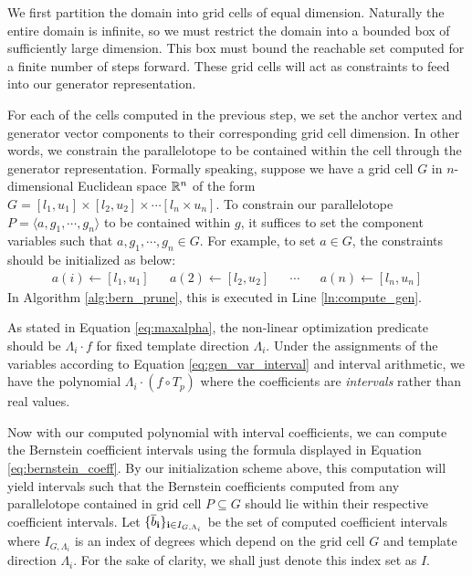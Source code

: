\begin{enumerate}[leftmargin=*]
 We first partition the domain into grid cells of equal dimension. Naturally the entire domain is infinite, so we must restrict the domain into a bounded box of sufficiently large dimension. This box must bound the reachable set computed for a finite number of steps forward. These grid cells will act as constraints to feed into our generator representation.

 For each of the cells computed in the previous step, we set the anchor vertex and generator vector components to their corresponding grid cell dimension. In other words, we constrain the parallelotope to be contained within the cell through the generator representation. Formally speaking, suppose we have a grid cell $G$ in $n$-dimensional Euclidean space ${\mathbb{R}}^n$ of the form $G = [l_1,u_1] \times [l_2, u_2] \times \cdots [l_n \times u_n]$. To constrain our parallelotope $P = \langle a, g_1, \cdots, g_n\rangle$ to be contained within $g$, it suffices to set the component variables such that $a, g_1, \cdots, g_n \in G$. For example, to set $a \in G$, the constraints should be initialized as below:
\begin{align}
\label{eq:gen_var_interval}
  a(i) \gets [l_1,u_1] & & a(2) \gets [l_2, u_2] & & \cdots & & a(n) \gets [l_n,u_n]
\end{align}
%
%
In Algorithm \ref{alg:bern_prune}, this is executed in Line \ref{ln:compute_gen}.

 As stated in Equation \ref{eq:maxalpha}, the non-linear optimization predicate should be $\Lambda_i\cdot f$ for fixed template direction $\Lambda_i$. Under the assignments of the variables according to Equation \ref{eq:gen_var_interval} and interval arithmetic, we have the polynomial $\Lambda_i\cdot(f \circ T_p)$ where the coefficients are \emph{intervals} rather than real values.

 Now with our computed polynomial with interval coefficients, we can compute the Bernstein coefficient intervals using the formula displayed in Equation \ref{eq:bernstein_coeff}. By our initialization scheme above, this computation will yield intervals such that the Bernstein coefficients computed from any parallelotope contained in grid cell $P \subseteq G$ should lie within their respective coefficient intervals. Let $\{\overline{b}_{{\bf i}}\}_{{\bf i} \in I_{G,\Lambda_i}}$ be the set of computed coefficient intervals where $I_{G,\Lambda_i}$ is an index of degrees which depend on the grid cell $G$ and template direction $\Lambda_i$. For the sake of clarity, we shall just denote this index set as $I$.


\end{enumerate}
